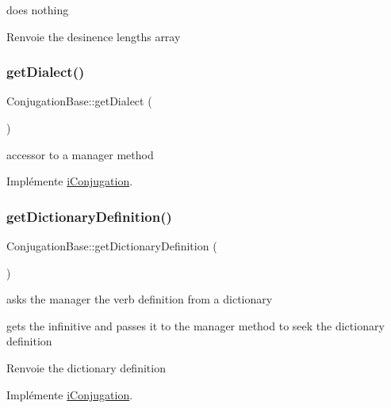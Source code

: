 does nothing

\begin{DoxyReturn}{Renvoie}
the desinence lengths array 
\end{DoxyReturn}
\hypertarget{class_conjugation_base_a5010621a363fcfe26e5d23ade06d2c41}{}\label{class_conjugation_base_a5010621a363fcfe26e5d23ade06d2c41} 
\subsubsection{\texorpdfstring{get\+Dialect()}{getDialect()}}
{\footnotesize\ttfamily Conjugation\+Base\+::get\+Dialect (\begin{DoxyParamCaption}{ }\end{DoxyParamCaption})}

accessor to a manager method 

Implémente \hyperlink{interfacei_conjugation_a4e0b6c0923ecd596b6acff6c7b776f5f}{i\+Conjugation}.

\hypertarget{class_conjugation_base_aae493e154b07045a3ea072760ac44ef4}{}\label{class_conjugation_base_aae493e154b07045a3ea072760ac44ef4} 
\subsubsection{\texorpdfstring{get\+Dictionary\+Definition()}{getDictionaryDefinition()}}
{\footnotesize\ttfamily Conjugation\+Base\+::get\+Dictionary\+Definition (\begin{DoxyParamCaption}{ }\end{DoxyParamCaption})}



asks the manager the verb definition from a dictionary 

gets the infinitive and passes it to the manager method to seek the dictionary definition

\begin{DoxyReturn}{Renvoie}
the dictionary definition 
\end{DoxyReturn}


Implémente \hyperlink{interfacei_conjugation_ab13cedc1b4f0d064a9bfff3cbfb63de6}{i\+Conjugation}.

